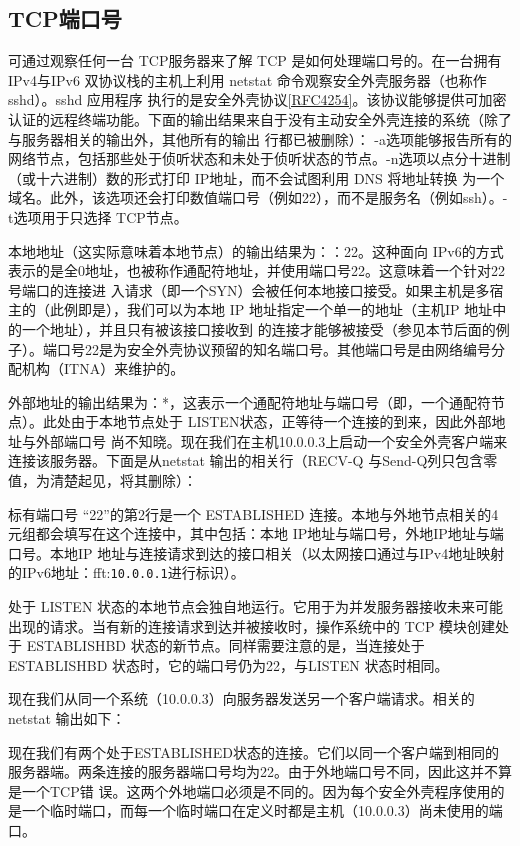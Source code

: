 \subsection{TCP端口号}
可通过观察任何一台 TCP服务器来了解 TCP 是如何处理端口号的。在一台拥有 IPv4与IPv6 双协议栈的主机上利用 netstat
命令观察安全外壳服务器（也称作 sshd）。sshd 应用程序
执行的是安全外壳协议\href{https://www.rfc-editor.org/rfc/rfc4254}{[RFC4254]}。该协议能够提供可加密认证的远程终端功能。下面的输出结果来自于没有主动安全外壳连接的系统（除了与服务器相关的输出外，其他所有的输出
行都已被删除）：
-a选项能够报告所有的网络节点，包括那些处于侦听状态和未处于侦听状态的节点。-n选项以点分十进制（或十六进制）数的形式打印
IP地址，而不会试图利用 DNS 将地址转换
为一个域名。此外，该选项还会打印数值端口号（例如22），而不是服务名（例如ssh）。-t选项用于只选择 TCP节点。

本地地址（这实际意味着本地节点）的输出结果为：：22。这种面向
IPv6的方式表示的是全0地址，也被称作通配符地址，并使用端口号22。这意味着一个针对22号端口的连接进
入请求（即一个SYN）会被任何本地接口接受。如果主机是多宿主的（此例即是），我们可以为本地 IP 地址指定一个单一的地址（主机IP
地址中的一个地址），并且只有被该接口接收到
的连接才能够被接受（参见本节后面的例子）。端口号22是为安全外壳协议预留的知名端口号。其他端口号是由网络编号分配机构（ITNA）来维护的。

外部地址的输出结果为：*，这表示一个通配符地址与端口号（即，一个通配符节点）。此处由于本地节点处于
LISTEN状态，正等待一个连接的到来，因此外部地址与外部端口号
尚不知晓。现在我们在主机10.0.0.3上启动一个安全外壳客户端来连接该服务器。下面是从netstat 输出的相关行（RECV-Q
与Send-Q列只包含零值，为清楚起见，将其删除）：

标有端口号 “22”的第2行是一个 ESTABLISHED 连接。本地与外地节点相关的4元组都会填写在这个连接中，其中包括：本地
IP地址与端口号，外地IP地址与端口号。本地IP
地址与连接请求到达的接口相关（以太网接口通过与IPv4地址映射的IPv6地址：fft:\verb|10.0.0.1|进行标识）。

处于 LISTEN 状态的本地节点会独自地运行。它用于为并发服务器接收未来可能出现的请求。当有新的连接请求到达并被接收时，操作系统中的
TCP 模块创建处于 ESTABLISHBD
状态的新节点。同样需要注意的是，当连接处于 ESTABLISHBD 状态时，它的端口号仍为22，与LISTEN 状态时相同。

现在我们从同一个系统（10.0.0.3）向服务器发送另一个客户端请求。相关的 netstat 输出如下：

现在我们有两个处于ESTABLISHED状态的连接。它们以同一个客户端到相同的服务器端。两条连接的服务器端口号均为22。由于外地端口号不同，因此这并不算是一个TCP错
误。这两个外地端口必须是不同的。因为每个安全外壳程序使用的是一个临时端口，而每一个临时端口在定义时都是主机（10.0.0.3）尚未使用的端口。

